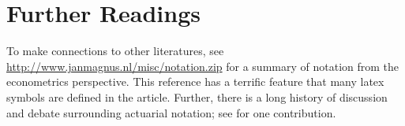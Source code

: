 \documentclass[]{book}
\theoremstyle{definition}
\theoremstyle{definition}
\theoremstyle{definition}
\theoremstyle{remark}
\begin{document}
\section{Further Readings}\label{further-readings}

To make connections to other literatures, see \citep{abadir2002notation}
\url{http://www.janmagnus.nl/misc/notation.zip} for a summary of
notation from the econometrics perspective. This reference has a
terrific feature that many latex symbols are defined in the article.
Further, there is a long history of discussion and debate surrounding
actuarial notation; see \citep{boehm1975thoughts} for one contribution.


\end{document}
